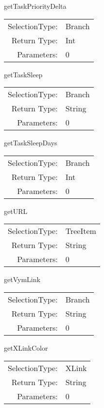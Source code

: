 \item getTaskPriorityDelta\\
\begin{tabular}{rl}
  SelectionType: & Branch\\
    Return Type: & Int\\
     Parameters: & 0\\
\end{tabular}

\item getTaskSleep\\
\begin{tabular}{rl}
  SelectionType: & Branch\\
    Return Type: & String\\
     Parameters: & 0\\
\end{tabular}

\item getTaskSleepDays\\
\begin{tabular}{rl}
  SelectionType: & Branch\\
    Return Type: & Int\\
     Parameters: & 0\\
\end{tabular}

\item getURL\\
\begin{tabular}{rl}
  SelectionType: & TreeItem\\
    Return Type: & String\\
     Parameters: & 0\\
\end{tabular}

\item getVymLink\\
\begin{tabular}{rl}
  SelectionType: & Branch\\
    Return Type: & String\\
     Parameters: & 0\\
\end{tabular}

\item getXLinkColor\\
\begin{tabular}{rl}
  SelectionType: & XLink\\
    Return Type: & String\\
     Parameters: & 0\\
\end{tabular}

